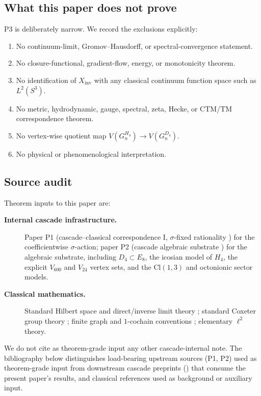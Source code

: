 \documentclass[11pt, a4paper]{amsart}
\theoremstyle{definition}
\newcommand{\Cl}{\mathrm{Cl}}
\newcommand{\inv}{\mathrm{inv}}
\begin{document}
\subsection{What this paper does not prove}

P3 is deliberately narrow. We record the exclusions explicitly:
\begin{enumerate}
\item No continuum-limit, Gromov--Hausdorff, or spectral-convergence
  statement.
\item No closure-functional, gradient-flow, energy, or
  monotonicity theorem.
\item No identification of $X_\inv$ with any classical continuum
  function space such as $L^2(S^3)$.
\item No metric, hydrodynamic, gauge, spectral, zeta, Hecke, or
  CTM/TM correspondence theorem.
\item No vertex-wise quotient map $V(G_n^{H_4}) \to V(G_n^{D_4})$.
\item No physical or phenomenological interpretation.
\end{enumerate}

\subsection{Source audit}

Theorem inputs to this paper are:
\begin{description}
\item[\textbf{Internal cascade infrastructure.}]
Paper P1 (cascade--classical correspondence I, $\sigma$-fixed
rationality \cite{SigmaRationality}) for the coefficientwise
$\sigma$-action; paper P2 (cascade algebraic substrate
\cite{AlgebraicSubstrate}) for the algebraic substrate, including
$D_4 \subset E_8$, the icosian model of $H_4$, the explicit
$V_{600}$ and $V_{24}$ vertex sets, and the $\Cl(1, 3)$ and
octonionic sector models.
\item[\textbf{Classical mathematics.}]
Standard Hilbert space and direct/inverse limit theory
\cite{ReedSimonI, Bogachev}; standard Coxeter group theory
\cite{Humphreys, CoxeterRegularPolytopes}; finite graph and
$1$-cochain conventions \cite{Hatcher}; elementary $\ell^2$ theory.
\end{description}

We do not cite as theorem-grade input any other cascade-internal
note. The bibliography below distinguishes load-bearing
upstream sources (P1, P2) used as theorem-grade input from
downstream cascade preprints
(\cite{CascadeClosureDynamics, CascadeRefinementCompat,
CascadeMechanism}) that consume the present paper's results, and
classical references used as background or auxiliary input.
\end{document}
